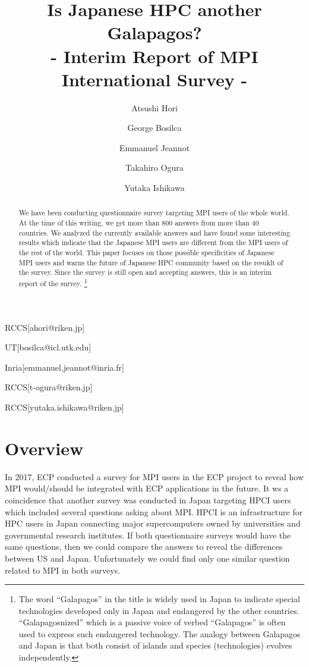 \documentclass[submit,techrep,noauthor,english]{ipsj}
\begin{document}
\title{Is Japanese HPC another Galapagos?\\
- Interim Report of MPI International Survey -}


\author{Atsushi Hori}{RCCS}[ahori@riken.jp]
\author{George Bosilca}{UT}[bosilca@icl.utk.edu]
\author{Emmanuel Jeannot}{Inria}[emmanuel.jeannot@inria.fr]
\author{Takahiro Ogura}{RCCS}[t-ogura@riken.jp]
\author{Yutaka Ishikawa}{RCCS}[yutaka.ishikawa@riken.jp]

\begin{abstract}
We have been conducting questionnaire survey targeting MPI users of
the whole world.  At the time of this writing, we get more than 800
answers from more than 40 countries.
We analyzed the currently available answers and have found some
interesting results which indicate that the Japanese MPI users are
different from the MPI users of the rest of the world. This paper focuses
on those possible specificities of Japanese MPI users and warns
the future of Japanese HPC community based on the resuklt of the
survey. Since the survey is still open and accepting answers, this is
an interim report of the survey. 
\footnote{The word ``Galapagos'' in the title is widely used in Japan to
indicate special technologies developed only in Japan and endangered
by the other countries.  ``Galapagosnized'' which is a passive voice of
verbed ``Galapagos'' is often used to express such endangered
technology.  The analogy between Galapagos and Japan is
that both consist of islands and species (technologies) evolves
independently.}
\end{abstract}

\maketitle

\section{Overview}

In 2017, ECP\cite{ECP} conducted a survey for MPI users in the ECP
project to reveal how MPI would/should be integrated with ECP
applications in the future\cite{osti_1462877}.  It ws a coincidence
that another survey was conducted in Japan targeting HPCI\cite{HPCI}
users which included several questions asking about
MPI\cite{hpci-user-survey}.  HPCI is an infrastructure for HPC users
in Japan connecting major supercomputers owned by universities and
governmental research institutes. If both questionnaire surveys would
have the same questions, then we could compare the answers to reveal
the differences between US and Japan. Unfortunately we could find only
one similar question related to MPI in both surveys.
\end{document}
